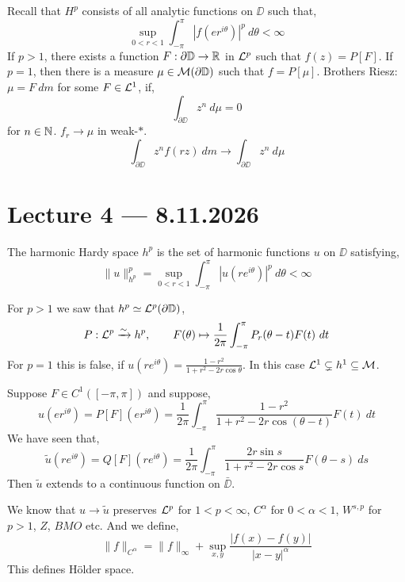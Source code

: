 Recall that $H^p$ consists of all analytic functions on $\DD$ such that,
\[
	\sup_{0 < r < 1} \int_{-\pi}^{\pi} {| f(e r^{i \theta}) |}^p\ d \theta < \infty
\]
If $p > 1$, there exists a function $F : \partial \mathbb{D} \to \mathbb{R}$ in $\mathcal{L}^p$ such that $f(z) = P[F]$.
If $p = 1$, then there is a measure $\mu \in \mathcal{M}(\partial \mathbb{D})$ such that $f = P[\mu]$.
Brothers Riesz: $\mu = F\ d m$ for some $F \in \mathcal{L}^1$, if,
\[
	\int_{\partial \DD} z^n\ d \mu
	= 0
\]
for $n \in \mathbb{N}$.
$f_r \to \mu$ in weak-$*$.
\[
	\int_{\partial \DD} z^n f(r z)\ dm
	\to \int_{\partial \DD} z^n\ d \mu
\]

\section{Lecture 4 --- 8.11.2026}
\begin{definition}
	The harmonic Hardy space $h^p$ is the set of harmonic functions $u$ on $\DD$ satisfying,
	\[
		\lVert u \rVert_{h^p}^p
		= \sup_{0 < r < 1} \int_{-\pi}^{\pi} {| u(r e^{i \theta}) |}^p\ d \theta
		< \infty
	\]
\end{definition}
For $p > 1$ we saw that $h^p \simeq \mathcal{L}^p(\partial \mathbb{D})$,
\[
	P : \Ll^p \xrightarrow{\sim} h^p,
	\qquad
	F(\theta)
	\mapsto \frac{1}{2 \pi} \int_{-\pi}^{\pi} P_r(\theta - t) F(t)\ dt
\]
For $p = 1$ this is false, if $u(r e^{i \theta}) = \frac{1 - r^2}{1 + r^2 - 2 r \cos \theta}$.
In this case $\mathcal{L}^1 \subsetneq h^1 \subseteq \mathcal{M}$.
\begin{lemma}
	Suppose $F \in C^1([-\pi, \pi])$ and suppose,
	\[
		u(e r^{i \theta})
		= P[F](e r^{i \theta})
		= \frac{1}{2 \pi} \int_{-\pi}^{\pi} \frac{1 - r^2}{1 + r^2 - 2 r \cos(\theta - t)} F(t)\ dt
	\]
	We have seen that,
	\[
		\tilde{u}(r e^{i \theta})
		= Q[F](r e^{i \theta})
		= \frac{1}{2 \pi} \int_{-\pi}^{\pi} \frac{2 r \sin s}{1 + r^2 - 2 r \cos s} F(\theta - s)\ ds
	\]
	Then $\tilde{u}$ extends to a continuous function on $\bar{\DD}$.
\end{lemma}
We know that $u \to \tilde{u}$ preserves $\mathcal{L}^p$ for $1 < p < \infty$, $C^{\alpha}$ for $0 < \alpha < 1$, $W^{s, p}$ for $p > 1$, $Z$, $BMO$ etc.
And we define,
\[
	\lVert f \rVert_{C^{\alpha}}
	= \lVert f \rVert_\infty + \sup_{x, y} \frac{|f(x) - f(y)|}{{|x - y|}^{\alpha}}
\]
This defines Hölder space.
